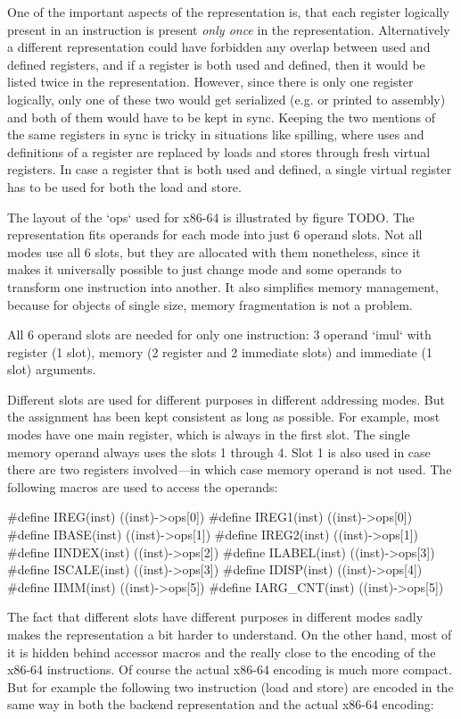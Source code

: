 One of the important aspects of the representation is, that each register
logically present in an instruction is present {\em only once} in the
representation. Alternatively a different representation could have forbidden
any overlap between used and defined registers, and if a register is both used
and defined, then it would be listed twice in the representation. However, since
there is only one register logically, only one of these two would get serialized
(e.g. or printed to assembly) and both of them would have to be kept in sync.
Keeping the two mentions of the same registers in sync is tricky in situations
like spilling, where uses and definitions of a register are replaced by loads
and stores through fresh virtual registers. In case a register that is both
used and defined, a single virtual register has to be used for both the load and
store.

The layout of the `ops` used for x86-64 is illustrated by figure TODO. The
representation fits operands for each mode into just 6 operand slots. Not all modes
use all 6 slots, but they are allocated with them nonetheless, since it makes it
universally possible to just change mode and some operands to transform one
instruction into another. It also simplifies memory management, because
for objects of single size, memory fragmentation is not a problem.

All 6 operand slots are needed for only one instruction: 3 operand `imul` with
register (1 slot), memory (2 register and 2 immediate slots) and immediate (1
slot) arguments.

Different slots are used for different purposes in different addressing modes.
But the assignment has been kept consistent as long as possible. For example,
most modes have one main register, which is always in the first slot. The single
memory operand always uses the slots 1 through 4. Slot 1 is also used in case
there are two registers involved---in which case memory operand is not used. The
following macros are used to access the operands:

\begtt
#define IREG(inst)     ((inst)->ops[0])
#define IREG1(inst)    ((inst)->ops[0])
#define IBASE(inst)    ((inst)->ops[1])
#define IREG2(inst)    ((inst)->ops[1])
#define IINDEX(inst)   ((inst)->ops[2])
#define ILABEL(inst)   ((inst)->ops[3])
#define ISCALE(inst)   ((inst)->ops[3])
#define IDISP(inst)    ((inst)->ops[4])
#define IIMM(inst)     ((inst)->ops[5])
#define IARG_CNT(inst) ((inst)->ops[5])
\endtt

The fact that different slots have different purposes in different modes sadly
makes the representation a bit harder to understand. On the other hand, most of
it is hidden behind accessor macros and the really close to the encoding of the
x86-64 instructions. Of course the actual x86-64 encoding is much more compact.
But for example the following two instruction (load and store) are encoded in
the same way in both the backend representation and the actual x86-64 encoding:

